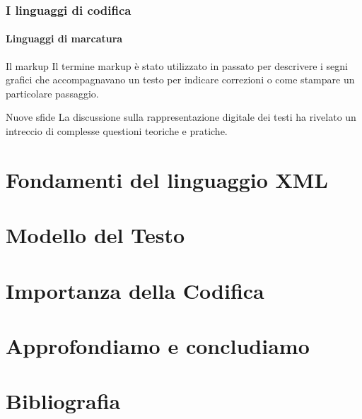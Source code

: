 \documentclass{beamer}
\begin{document}
    
    \begin{frame}
        \frametitle{I linguaggi di codifica}
        \framesubtitle{Linguaggi di marcatura}
        \addtocounter{nframe}{1}
    
        \begin{block}{Il markup}
            Il termine markup è stato utilizzato in passato per descrivere i segni grafici che accompagnavano  un testo per indicare correzioni o come stampare un particolare passaggio.
        \end{block}
    
        \begin{block}{Nuove sfide}
            La discussione sulla rappresentazione digitale dei testi ha rivelato un intreccio di complesse questioni teoriche e pratiche.
        \end{block}
    
    \end{frame}
    
    
    \section{Fondamenti del linguaggio XML}
    
    
    \section{Modello del Testo}
    
    
    \section{Importanza della Codifica}
    
    
    
    \section{Approfondiamo e concludiamo}
    
    
    
    
    \section*{Bibliografia}
    
    
    
\end{document}
